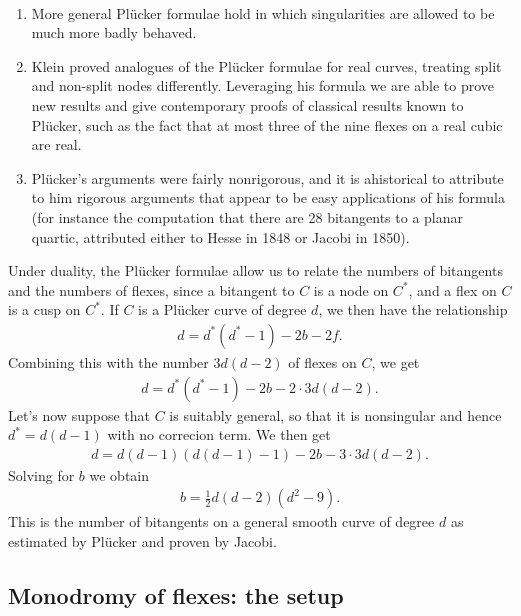 \documentclass[11pt]{amsart}
\begin{document}
\begin{remark} \,
\begin{enumerate}
    \item More general Pl\"{u}cker formulae hold in which singularities are allowed to be much more badly behaved.
    \item Klein proved analogues of the Pl\"{u}cker formulae for real curves, treating split and non-split nodes differently. Leveraging his formula we are able to prove new results and give contemporary proofs of classical results known to Pl\"{u}cker, such as the fact that at most three of the nine flexes on a real cubic are real.
    \item Pl\"{u}cker's arguments were fairly nonrigorous, and it is ahistorical to attribute to him rigorous arguments that appear to be easy applications of his formula (for instance the computation that there are 28 bitangents to a planar quartic, attributed either to Hesse in 1848 or Jacobi in 1850).
\end{enumerate}
\end{remark}

Under duality, the Pl\"{u}cker formulae allow us to relate the numbers of bitangents and the numbers of flexes, since a bitangent to $C$ is a node on $C^\ast$, and a flex on $C$ is a cusp on $C^\ast$. If $C$ is a Pl\"{u}cker curve of degree $d$, we then have the relationship
\begin{align*}
    d = d^\ast(d^\ast-1) - 2b - 2f.
\end{align*}
Combining this with the number $3d(d-2)$ of flexes on $C$, we get
\begin{align*}
    d = d^\ast(d^\ast-1) - 2b - 2\cdot 3d(d-2).
\end{align*}
Let's now suppose that $C$ is suitably general, so that it is nonsingular and hence $d^\ast = d(d-1)$ with no correcion term. We then get
\begin{align*}
    d = d(d-1)\left( d(d-1)-1 \right) - 2b - 3\cdot 3d(d-2).
\end{align*}
Solving for $b$ we obtain
\begin{equation}\label{eqn:bitangents-in-terms-of-degree}
\begin{aligned}
    b = \frac{1}{2}d(d-2)(d^2-9).
\end{aligned}
\end{equation}
This is the number of bitangents on a general smooth curve of degree $d$ as estimated by Pl\"{u}cker and proven by Jacobi.

\subsection{Monodromy of flexes: the setup}
\end{document}
